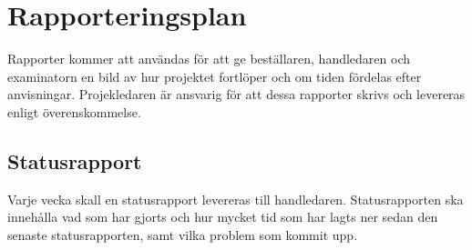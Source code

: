 \section{Rapporteringsplan}
Rapporter kommer att användas för att ge beställaren, handledaren och examinatorn en bild av hur projektet fortlöper och om tiden fördelas efter anvisningar. Projekledaren är ansvarig för att dessa rapporter skrivs och levereras enligt överenskommelse.

\subsection{Statusrapport}
Varje vecka skall en statusrapport levereras till handledaren. Statusrapporten ska innehålla vad som har gjorts och hur mycket tid som har lagts ner sedan den senaste statusrapporten, samt vilka problem som kommit upp.


